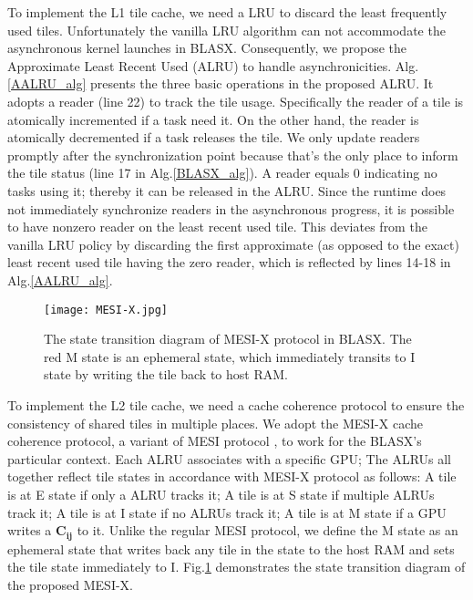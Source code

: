 \documentclass[conference]{IEEEtran}
\begin{document}
To implement the L1 tile cache, we need a LRU to discard the least frequently used tiles.
Unfortunately the vanilla LRU algorithm \cite{LRU} can not accommodate the asynchronous kernel 
launches in BLASX. Consequently, we propose the Approximate Least Recent Used (ALRU) to handle asynchronicities.
Alg.\ref{AALRU_alg} presents the three basic operations in the proposed ALRU.
It adopts a reader (line 22) to track the tile usage. Specifically 
the reader of a tile is atomically incremented if a task need it. On the other hand, the 
reader is atomically decremented if a task releases the tile. We only update readers promptly 
after the synchronization point because that's the only place to inform the tile status 
(line 17 in Alg.\ref{BLASX_alg}). A reader equals 0 indicating no tasks using it; thereby 
it can be released in the ALRU. Since the runtime does not immediately synchronize readers 
in the asynchronous progress, it is possible to have nonzero reader on the least recent used 
tile. This deviates from the vanilla LRU policy by discarding the first approximate (as opposed to the exact)
least recent used tile having the zero reader, which is reflected by lines 14-18 in Alg.\ref{AALRU_alg}.
\begin{figure}[!t]
\vspace{-0.1in}
\centering
\texttt{[image: MESI-X.jpg]}
\caption{The state transition diagram of MESI-X protocol in BLASX. The red M state is an ephemeral state, 
which immediately transits to I state by writing the tile back to host RAM.}
\label{MESI-X}
\vspace{-0.25in}
\end{figure}

To implement the L2 tile cache, we need a cache coherence protocol to ensure the consistency of shared tiles in 
multiple places. We adopt the MESI-X cache coherence protocol, a variant of MESI protocol \cite{MOESI}, to work for the BLASX's particular
context. Each ALRU associates with a specific GPU; The ALRUs all together reflect tile states in accordance with 
MESI-X protocol as follows: A tile is at E state if only a ALRU tracks it; A tile is at S state if multiple ALRUs 
track it; A tile is at I state if no ALRUs track it; A tile is at M state if a GPU writes a $\mathbf{C_{ij}}$ to it. Unlike the
regular MESI protocol, we define the M state as an ephemeral state that writes back any tile in the state to the host RAM 
and sets the tile state immediately to I. Fig.\ref{MESI-X} demonstrates the state transition diagram of the proposed MESI-X.
\end{document}
